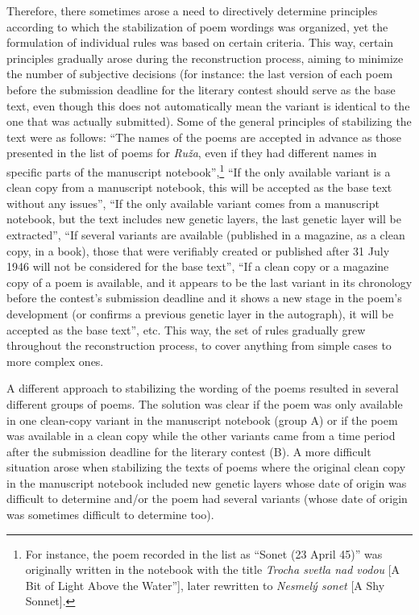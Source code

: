 \begin{paper}
Therefore, there sometimes arose a need to directively determine
principles according to which the stabilization of poem wordings was
organized, yet the formulation of individual rules was based on certain
criteria. This way, certain principles gradually arose during the
reconstruction process, aiming to minimize the number of subjective
decisions (for instance: the last version of each poem before the
submission deadline for the literary contest should serve as the base
text, even though this does not automatically mean the variant is
identical to the one that was actually submitted). Some of the general
principles of stabilizing the text were as follows: ``The names of the
poems are accepted in advance as those presented in the list of poems
for \emph{Ruža}, even if they had different names in specific parts of
the manuscript notebook'',\footnote{For instance, the poem recorded in
  the list as ``Sonet (23 April 45)'' was originally written in the
  notebook with the title \emph{Trocha svetla nad vodou} [A Bit of Light
  Above the Water''], later rewritten to \emph{Nesmelý sonet} [A Shy
  Sonnet].} ``If the only available variant is a clean copy from
a manuscript notebook, this will be accepted as the base text without
any issues'', ``If the only available variant comes from a manuscript
notebook, but the text includes new genetic layers, the last genetic
layer will be extracted'', ``If several variants are available
(published in a magazine, as a clean copy, in a book), those that were
verifiably created or published after 31 July 1946 will not be
considered for the base text'', ``If a clean copy or a magazine copy of
a poem is available, and it appears to be the last variant in its chronology
before the contest's submission deadline and it shows a new stage in the
poem's development (or confirms a previous genetic layer in the
autograph), it will be accepted as the base text'', etc. This way, the set of rules
gradually grew throughout the reconstruction process, to cover anything from simple
cases to more complex ones.

A different approach to stabilizing the wording of the poems resulted in
several different groups of poems. The solution was clear if the poem
was only available in one clean-copy variant in the manuscript notebook
(group A) or if the poem was available in a clean copy while the other
variants came from a time period after the submission deadline for the
literary contest (B). A more difficult situation arose when stabilizing
the texts of poems where the original clean copy in the manuscript
notebook included new genetic layers whose date of origin was difficult
to determine and/or the poem had several variants (whose date of origin
was sometimes difficult to determine too).


\end{paper}
